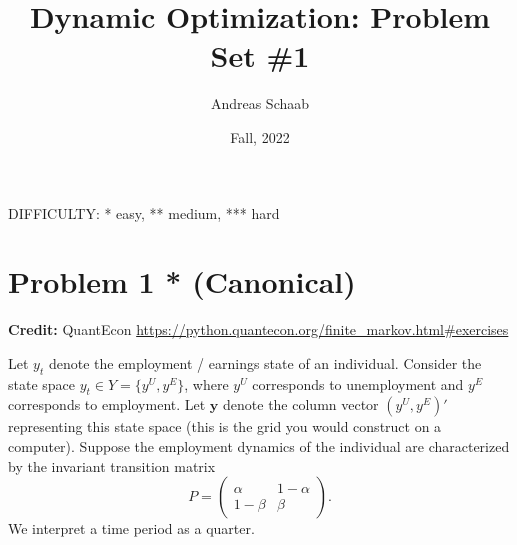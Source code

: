 \documentclass[11pt]{extarticle}
\title{Dynamic Optimization: Problem Set \#1}
\author{Andreas Schaab}
\date{Fall, 2022}
\theoremstyle{plain}
\theoremstyle{definition}
\begin{document}
\maketitle
\thispagestyle{empty}
\setcounter{page}{0}


DIFFICULTY: * easy, ** medium, *** hard

\vspace{10mm}
\section*{Problem 1 * (Canonical)}

\textbf{Credit:} QuantEcon \url{https://python.quantecon.org/finite_markov.html#exercises}
 
\vspace{5mm}
\noindent
Let $y_t$ denote the employment / earnings state of an individual. Consider the state space $y_t \in Y = \{ y^U, y^E \}$, where $y^U$ corresponds to unemployment and $y^E$ corresponds to employment. Let $\bm y$ denote the column vector $(y^U, y^E)'$ representing this state space (this is the grid you would construct on a computer). Suppose the employment dynamics of the individual are characterized by the invariant transition matrix 
\begin{equation*}
	P = \begin{pmatrix} \alpha & 1 - \alpha \\ 1 - \beta & \beta \end{pmatrix}.
\end{equation*}
We interpret a time period as a quarter. 
\end{document}
